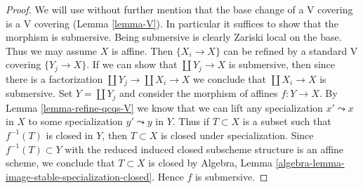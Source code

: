 \documentclass[10pt,a4paper]{amsart}
\theoremstyle{plain}
\theoremstyle{definition}
\theoremstyle{remark}
\numberwithin{equation}{subsection}
\begin{document}
\begin{proof}
We will use without further mention that the base change of a V covering
is a V covering (Lemma \ref{lemma-V}). In particular it suffices
to show that the morphism is submersive.
Being submersive is clearly Zariski local on the base.
Thus we may assume $X$ is affine. Then $\{X_i \to X\}$
can be refined by a standard V covering $\{Y_j \to X\}$.
If we can show that $\coprod Y_j \to X$ is submersive,
then since there is a factorization $\coprod Y_j \to \coprod X_i \to X$
we conclude that $\coprod X_i \to X$ is submersive.
Set $Y = \coprod Y_j$ and consider the morphism of affines
$f : Y \to X$.
By Lemma \ref{lemma-refine-qcqs-V} we know that we can lift any
specialization $x' \leadsto x$ in $X$ to some specialization
$y' \leadsto y$ in $Y$.
Thus if $T \subset X$ is a subset such that $f^{-1}(T)$
is closed in $Y$, then $T \subset X$ is closed under specialization.
Since $f^{-1}(T) \subset Y$
with the reduced induced closed subscheme structure
is an affine scheme, we conclude that $T \subset X$ is closed by
Algebra, Lemma \ref{algebra-lemma-image-stable-specialization-closed}.
Hence $f$ is submersive.
\end{proof}
\end{document}

